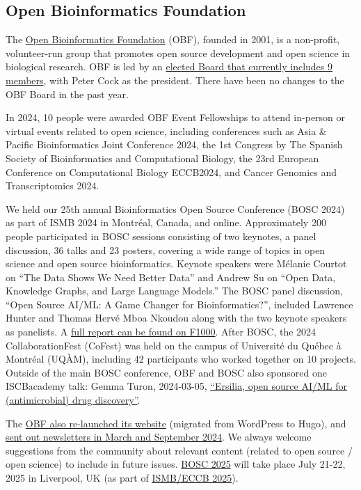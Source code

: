 \documentclass[a4paper]{report}
\begin{document}
\subsection{Open Bioinformatics Foundation}

The \href{https://www.open-bio.org/}{Open Bioinformatics Foundation} (OBF), founded in 2001, is a non-profit, volunteer-run group that promotes open source development and open science in biological research. OBF is led by an \href{https://www.open-bio.org/board/}{elected Board that currently includes 9 members}, with Peter Cock as the president. There have been no changes to the OBF Board in the past year.

In 2024, 10 people were awarded OBF Event Fellowships to attend in-person or virtual events related to open science, including conferences such as Asia \& Pacific Bioinformatics Joint Conference 2024, the 1st Congress by The Spanish Society of Bioinformatics and Computational Biology, the 23rd European Conference on Computational Biology ECCB2024, and Cancer Genomics and Transcriptomics 2024.

We held our 25th annual Bioinformatics Open Source Conference (BOSC 2024) as part of ISMB 2024 in Montréal, Canada, and online. Approximately 200 people participated in BOSC sessions consisting of two keynotes, a panel discussion, 36 talks and 23 posters, covering a wide range of topics in open science and open source bioinformatics. Keynote speakers were Mélanie Courtot on ``The Data Shows We Need Better Data'' and Andrew Su on ``Open Data, Knowledge Graphs, and Large Language Models.'' The BOSC panel discussion, ``Open Source AI/ML: A Game Changer for Bioinformatics?'', included Lawrence Hunter and Thomas Hervé Mboa Nkoudou along with the two keynote speakers as panelists. A \href{https://f1000research.com/articles/13-1100}{full report can be found on F1000}. After BOSC, the 2024 CollaborationFest (CoFest) was held on the campus of Université du Québec à Montréal (UQÀM), including 42 participants who worked together on 10 projects. Outside of the main BOSC conference, OBF and BOSC also sponsored one ISCBacademy talk: Gemma Turon, 2024-03-05, \href{https://www.open-bio.org/2024/03/26/gemma-turon-iscbacademy-talk-video/}{“Ersilia, open source AI/ML for (antimicrobial) drug discovery”}.

The \href{https://www.open-bio.org/}{OBF also re-launched its website} (migrated from WordPress to Hugo), and \href{https://github.com/OBF/newsletter/tree/master/newsletters}{sent out newsletters in March and September 2024}. We always welcome suggestions from the community about relevant content (related to open source / open science) to include in future issues.
\href{https://www.open-bio.org/events/bosc-2025/}{BOSC 2025} will take place July 21-22, 2025 in Liverpool, UK (as part of \href{https://www.iscb.org/ismbeccb2025/home}{ISMB/ECCB 2025}).
\end{document}
